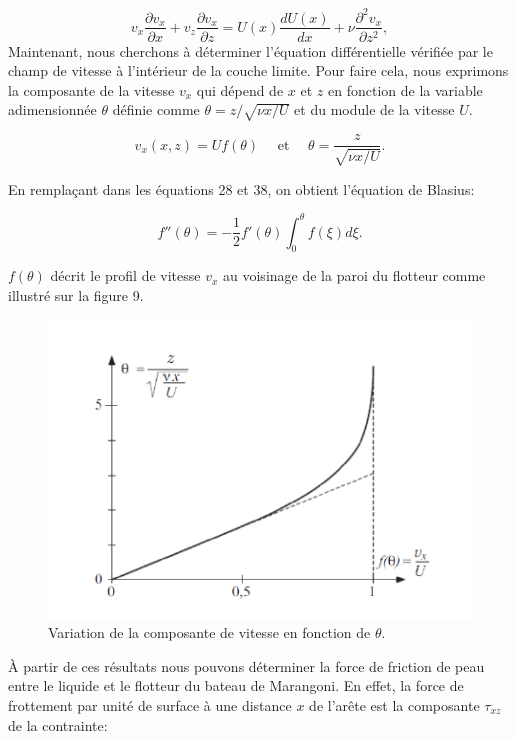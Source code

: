 \documentclass[french, 10pt]{article}
\begin{document}
\begin{equation}
  v_x\frac{\partial v_x}{\partial x}+v_z\frac{\partial v_x}{\partial z} = U(x)\frac{dU(x)}{dx} + \nu\frac{\partial^2v_x}{\partial z^2}\label{eq:resNS},
\end{equation}
Maintenant, nous cherchons à déterminer l'équation différentielle vérifiée par le champ de vitesse à l'intérieur de la couche limite. Pour faire cela, nous exprimons la composante de la vitesse $v_x$ qui dépend de $x$ et $z$ en fonction de la variable adimensionnée $\theta$ définie comme $\theta = z/\sqrt{\nu x /U}$  et du module de la vitesse $U$.

\begin{equation}
  v_x(x,z) = Uf(\theta)~~~~~~\text{et}~~~~~~\theta=\frac{z}{\sqrt{\nu x /U}}.
\end{equation}

En remplaçant dans les équations 28 et 38, on obtient l'équation de Blasius:

\begin{equation}
  f''(\theta) = -\frac{1}{2}f'(\theta)\int_0^{\theta}{f(\xi )d\xi}.
\end{equation}

$f(\theta)$ décrit le profil de vitesse $v_x$ au voisinage de la paroi du flotteur comme illustré sur la figure 9.\bigskip 

\begin{figure}%
  \centering
  \includegraphics{profilecouchelimite.pdf}
  \caption{Variation de la composante de vitesse en fonction de $\theta$.}
  \label{fig:profilVitesse}
\end{figure}

À partir de ces résultats nous pouvons déterminer la force de friction de peau entre le liquide et le flotteur du bateau de Marangoni. En effet, la force de frottement par unité de surface à une distance $x$ de l'arête est la composante $\tau_{xz}$ de la contrainte:
\end{document}
